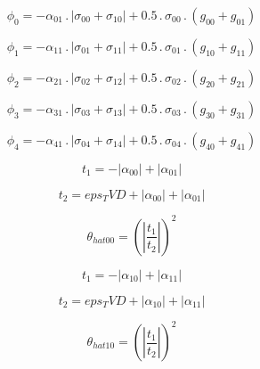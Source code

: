 \documentclass{article}
\begin{document}
\begin{dmath}\phi_{0} = - \alpha_{01} \,.\, \left|{\sigma_{0 0} + \sigma_{1 0}}\right| + 0.5 \,.\, \sigma_{0 0} \,.\, \left(g_{00} + g_{01}\right)\end{dmath}

\begin{dmath}\phi_{1} = - \alpha_{11} \,.\, \left|{\sigma_{0 1} + \sigma_{1 1}}\right| + 0.5 \,.\, \sigma_{0 1} \,.\, \left(g_{10} + g_{11}\right)\end{dmath}

\begin{dmath}\phi_{2} = - \alpha_{21} \,.\, \left|{\sigma_{0 2} + \sigma_{1 2}}\right| + 0.5 \,.\, \sigma_{0 2} \,.\, \left(g_{20} + g_{21}\right)\end{dmath}

\begin{dmath}\phi_{3} = - \alpha_{31} \,.\, \left|{\sigma_{0 3} + \sigma_{1 3}}\right| + 0.5 \,.\, \sigma_{0 3} \,.\, \left(g_{30} + g_{31}\right)\end{dmath}

\begin{dmath}\phi_{4} = - \alpha_{41} \,.\, \left|{\sigma_{0 4} + \sigma_{1 4}}\right| + 0.5 \,.\, \sigma_{0 4} \,.\, \left(g_{40} + g_{41}\right)\end{dmath}

\begin{dmath}t_{1} = - \left|{\alpha_{00}}\right| + \left|{\alpha_{01}}\right|\end{dmath}

\begin{dmath}t_{2} = eps_TVD + \left|{\alpha_{00}}\right| + \left|{\alpha_{01}}\right|\end{dmath}

\begin{dmath}\theta_{hat 00} = \left(\left|{\frac{t_{1}}{t_{2}}}\right| \right)^{2}\end{dmath}

\begin{dmath}t_{1} = - \left|{\alpha_{10}}\right| + \left|{\alpha_{11}}\right|\end{dmath}

\begin{dmath}t_{2} = eps_TVD + \left|{\alpha_{10}}\right| + \left|{\alpha_{11}}\right|\end{dmath}

\begin{dmath}\theta_{hat 10} = \left(\left|{\frac{t_{1}}{t_{2}}}\right| \right)^{2}\end{dmath}
\end{document}
